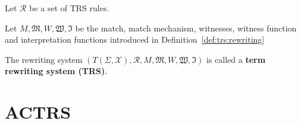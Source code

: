 \documentclass{book}
\begin{document}
  \begin{definition}
    Let $\mathcal{R}$ be a set of TRS rules. 

    Let $M, \mathfrak{M}, W , \mathfrak{W}, \mathfrak{I}$ be the match, match mechanism, witnesses, witness function and interpretation functions introduced in Definition~\ref{def:trs:rewriting}
 
    The rewriting system $(T(\Sigma,\mathcal{X}), \mathcal{R}, M, \mathfrak{M}, W, \mathfrak{W}, \mathfrak{I})$ is called a \textbf{term rewriting system (TRS)}.
  \end{definition}




\section{ACTRS}

\end{document}
